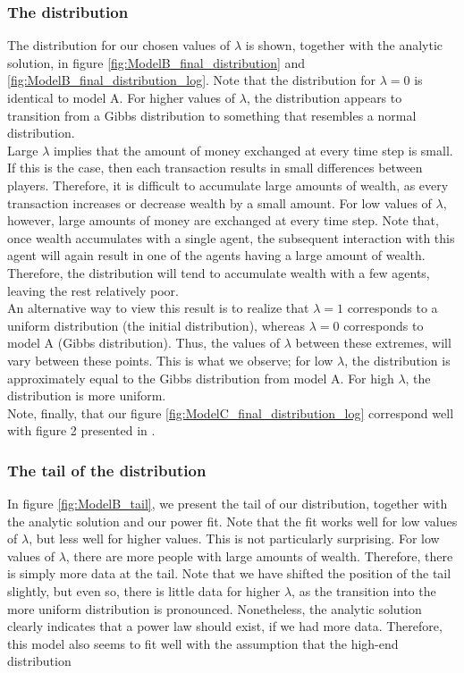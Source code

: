 \documentclass[a4paper, 10pt]{article}
\begin{document}
\subsubsection{The distribution}
The distribution for our chosen values of $\lambda$ is shown, together with the analytic solution, in figure \ref{fig:ModelB_final_distribution} and \ref{fig:ModelB_final_distribution_log}. Note that the distribution for $\lambda=0$ is identical to model A. For higher values of $\lambda$, the distribution appears to transition from a Gibbs distribution to something that resembles a normal distribution.\\
\linebreak
Large $\lambda$ implies that the amount of money exchanged at every time step is small. If this is the case, then each transaction results in small differences between players. Therefore, it is difficult to accumulate large amounts of wealth, as every transaction increases or decrease wealth by a small amount. For low values of $\lambda$, however, large amounts of money are exchanged at every time step. Note that, once wealth accumulates with a single agent, the subsequent interaction with this agent will again result in one of the agents having a large amount of wealth. Therefore, the distribution will tend to accumulate wealth with a few agents, leaving the rest relatively poor.\\
\linebreak
An alternative way to view this result is to realize that $\lambda=1$ corresponds to a uniform distribution (the initial distribution), whereas $\lambda=0$ corresponds to model A (Gibbs distribution). Thus, the values of $\lambda$ between these extremes, will vary between these points. This is what we observe; for low $\lambda$, the distribution is approximately equal to the Gibbs distribution from model A. For high $\lambda$, the distribution is more uniform. \\
\linebreak
Note, finally, that our figure \ref{fig:ModelC_final_distribution_log} correspond well with figure 2 presented in \cite{Gibbs}.
\subsubsection{The tail of the distribution}
In figure \ref{fig:ModelB_tail}, we present the tail of our distribution, together with the analytic solution and our power fit. Note that the fit works well for low values of $\lambda$, but less well for higher values. This is not particularly surprising. For low values of $\lambda$, there are more people with large amounts of wealth. Therefore, there is simply more data at the tail. Note that we have shifted the position of the tail slightly, but even so, there is little data for higher $\lambda$, as the transition into the more uniform distribution is pronounced. Nonetheless, the analytic solution clearly indicates that a power law should exist, if we had more data. Therefore, this model also seems to fit well with the assumption that the high-end distribution 
\newpage
\end{document}
